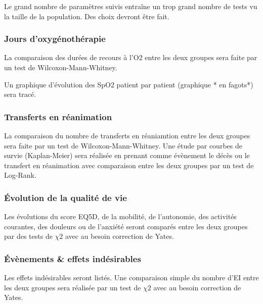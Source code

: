 \documentclass[
]{article}
\begin{document}
Le grand nombre de paramètres suivis entraîne un trop grand nombre de
tests vu la taille de la population. Des choix devront être fait.

\hypertarget{jours-doxyguxe9nothuxe9rapie}{%
\subsubsection{Jours
d'oxygénothérapie}\label{jours-doxyguxe9nothuxe9rapie}}

La comparaison des durées de recours à l'O2 entre les deux groupes sera
faite par un test de Wilcoxon-Mann-Whitney.

Un graphique d'évolution des SpO2 patient par patient (graphique * en
fagots*) sera tracé.

\hypertarget{transferts-en-ruxe9animation}{%
\subsubsection{Transferts en
réanimation}\label{transferts-en-ruxe9animation}}

La comparaison du nombre de transferts en réaniamtion entre les deux
groupes sera faite par un test de Wilcoxon-Mann-Whitney. Une étude par
courbes de survie (Kaplan-Meier) sera réalisée en prenant comme
évènement le décès ou le transfert en réanimation avec comparaison entre
les deux groupes par un test de Log-Rank.

\hypertarget{uxe9volution-de-la-qualituxe9-de-vie}{%
\subsubsection{Évolution de la qualité de
vie}\label{uxe9volution-de-la-qualituxe9-de-vie}}

Les évolutions du score EQ5D, de la mobilité, de l'autonomie, des
activités courantes, des douleurs ou de l'anxiété seront comparés entre
les deux groupes par des tests de \(\chi 2\) avec au besoin correction
de Yates.

\hypertarget{uxe9vuxe8nements-effets-induxe9sirables}{%
\subsubsection{Évènements \& effets
indésirables}\label{uxe9vuxe8nements-effets-induxe9sirables}}

Les effets indésirables seront listés. Une comparaison simple du nombre
d'EI entre les deux groupes sera réalisée par un test de \(\chi 2\) avec
au besoin correction de Yates.
\end{document}
